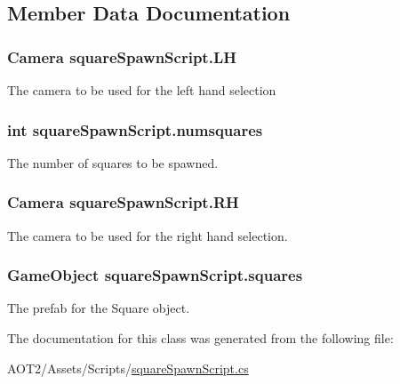 \subsection{Member Data Documentation}
\hypertarget{classsquare_spawn_script_abf8f64837c29453bfe6231d48b06b483}{}
\subsubsection[{L\+H}]{\setlength{\rightskip}{0pt plus 5cm}Camera square\+Spawn\+Script.\+L\+H}\label{classsquare_spawn_script_abf8f64837c29453bfe6231d48b06b483}
The camera to be used for the left hand selection \hypertarget{classsquare_spawn_script_aee81b01036a29f961a113a21183173e3}{}
\subsubsection[{numsquares}]{\setlength{\rightskip}{0pt plus 5cm}int square\+Spawn\+Script.\+numsquares}\label{classsquare_spawn_script_aee81b01036a29f961a113a21183173e3}
The number of squares to be spawned. \hypertarget{classsquare_spawn_script_acc39770a5d684a4b5e1057b832dc979d}{}
\subsubsection[{R\+H}]{\setlength{\rightskip}{0pt plus 5cm}Camera square\+Spawn\+Script.\+R\+H}\label{classsquare_spawn_script_acc39770a5d684a4b5e1057b832dc979d}
The camera to be used for the right hand selection. \hypertarget{classsquare_spawn_script_a353637659973cde399b46b194b30eb2e}{}
\subsubsection[{squares}]{\setlength{\rightskip}{0pt plus 5cm}Game\+Object square\+Spawn\+Script.\+squares}\label{classsquare_spawn_script_a353637659973cde399b46b194b30eb2e}
The prefab for the Square object. 

The documentation for this class was generated from the following file\+:\begin{DoxyCompactItemize}
\item 
A\+O\+T2/\+Assets/\+Scripts/\hyperlink{square_spawn_script_8cs}{square\+Spawn\+Script.\+cs}\end{DoxyCompactItemize}
